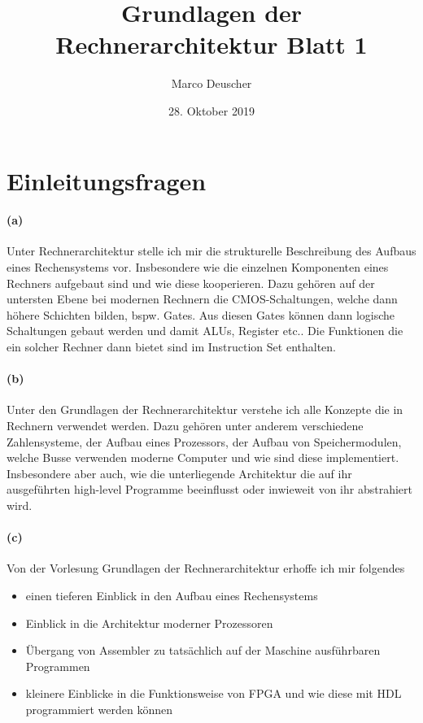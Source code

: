 \documentclass[a4paper]{article}
\title{Grundlagen der Rechnerarchitektur Blatt 1}
\author{Marco Deuscher}
\date{28. Oktober 2019}
\begin{document}
\maketitle

\section{Einleitungsfragen}
\paragraph{(a)}
Unter Rechnerarchitektur stelle ich mir die strukturelle Beschreibung des Aufbaus eines Rechensystems vor. Insbesondere wie die einzelnen Komponenten eines Rechners aufgebaut sind und wie diese kooperieren.  Dazu gehören auf der untersten Ebene bei modernen Rechnern die CMOS-Schaltungen, welche dann höhere Schichten bilden, bspw. Gates. Aus diesen Gates können dann logische Schaltungen gebaut werden und damit ALUs, Register etc.. Die Funktionen die ein solcher Rechner dann bietet sind im Instruction Set enthalten. 

\paragraph{(b)}
Unter den Grundlagen der Rechnerarchitektur verstehe ich alle Konzepte die in Rechnern verwendet werden. Dazu gehören unter anderem verschiedene Zahlensysteme, der Aufbau eines Prozessors, der Aufbau von Speichermodulen, welche Busse verwenden moderne Computer und wie sind diese implementiert. Insbesondere aber auch, wie die unterliegende Architektur die auf ihr ausgeführten high-level Programme beeinflusst oder inwieweit von ihr abstrahiert wird.

\paragraph{(c)}
Von der Vorlesung Grundlagen der Rechnerarchitektur erhoffe ich mir folgendes
\begin{itemize}
    \item einen tieferen Einblick in den Aufbau eines Rechensystems
    \item Einblick in die Architektur moderner Prozessoren
    \item Übergang von Assembler zu tatsächlich auf der Maschine ausführbaren Programmen
    \item kleinere Einblicke in die Funktionsweise von FPGA und wie diese mit HDL programmiert werden können
\end{itemize}
\end{document}
